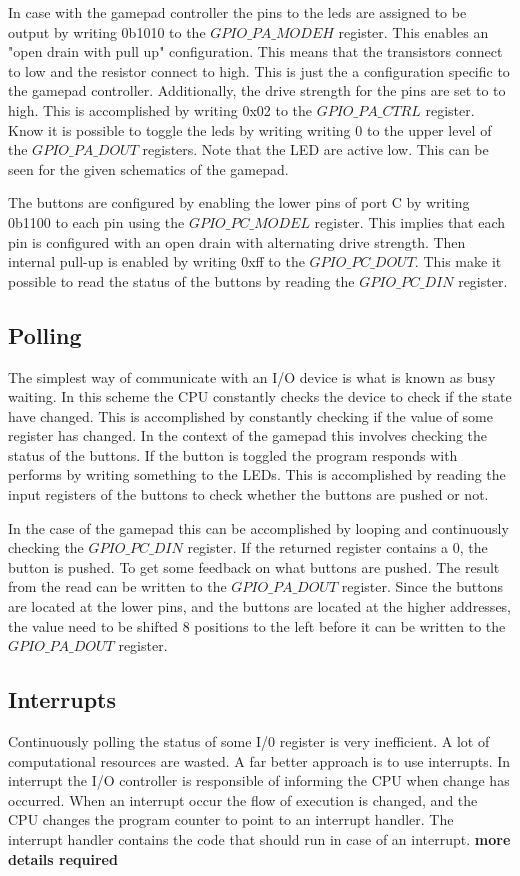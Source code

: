 In case with the gamepad controller the pins to the leds are assigned to be output by writing 0b1010 to the $GPIO\_PA\_MODEH$ register. This enables an "open drain with pull up" configuration. This means that the transistors connect to low and the resistor connect to high. This is just the a configuration specific to the gamepad controller. Additionally, the drive strength for the pins are set to to high. This is accomplished by writing 0x02 to the $GPIO\_PA\_CTRL$ register. Know it is possible to toggle the leds by writing writing 0 to the upper level of the $GPIO\_PA\_DOUT$ registers. Note that the LED are active low. This can be seen for the given schematics of the gamepad.   

The buttons are configured by enabling the lower pins of port C by writing 0b1100 to each pin using the $GPIO\_PC\_MODEL$ register. This implies that each pin is configured with an open drain with alternating drive strength. Then internal pull-up is enabled by writing 0xff to the $GPIO\_PC\_DOUT$. This make it possible to read the status of the buttons by reading the $GPIO\_PC\_DIN$ register. 



\subsection{Polling}\label{ch:polling}
The simplest way of communicate with an I/O device is what is known as busy waiting\cite{micro}. In this scheme the CPU constantly checks the device to check if the state have changed. This is accomplished by constantly checking if the value of some register has changed. In the context of the gamepad this involves checking the status of the buttons. If the button is toggled the program responds with performs by writing something to the LEDs. This is accomplished by reading the input registers of the buttons to check whether the buttons are pushed or not. 

In the case of the gamepad this can be accomplished by looping and continuously checking the $GPIO\_PC\_DIN$ register. If the returned register contains a 0, the button is pushed. To get some feedback on what buttons are pushed. The result from the read can be written to the $GPIO\_PA\_DOUT$ register. Since the buttons are located at the lower pins, and the buttons are located at the higher addresses, the value need to be shifted 8 positions to the left before it can be written to the $GPIO\_PA\_DOUT$ register. 

\subsection{Interrupts}\label{ch:interrupts}
Continuously polling the status of some I/0 register is very inefficient. A lot of computational resources are wasted. A far better approach is to use interrupts. In interrupt the I/O controller is responsible of informing the CPU when change has occurred. When an interrupt occur the flow of execution is changed, and the CPU changes the program counter to point to an interrupt handler. The interrupt handler contains the code that should run in case of an interrupt. {\bf more details required}

